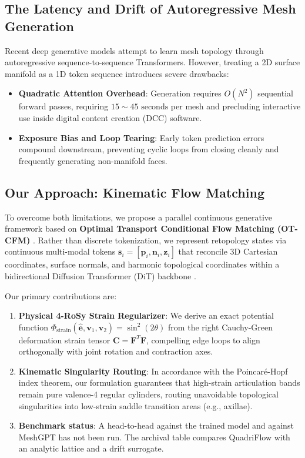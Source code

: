 \documentclass[acmtog,nonacm]{acmart}
\begin{document}
\subsection{The Latency and Drift of Autoregressive Mesh Generation}
Recent deep generative models \cite{nash2020polygen,siddiqui2024meshgpt} attempt to learn mesh topology through autoregressive sequence-to-sequence Transformers. However, treating a 2D surface manifold as a 1D token sequence introduces severe drawbacks:
\begin{itemize}
    \item \textbf{Quadratic Attention Overhead}: Generation requires $O(N^2)$ sequential forward passes, requiring $15\sim 45\text{ seconds}$ per mesh and precluding interactive use inside digital content creation (DCC) software.
    \item \textbf{Exposure Bias and Loop Tearing}: Early token prediction errors compound downstream, preventing cyclic loops from closing cleanly and frequently generating non-manifold faces.
\end{itemize}

\subsection{Our Approach: Kinematic Flow Matching}
To overcome both limitations, we propose a parallel continuous generative framework based on \textbf{Optimal Transport Conditional Flow Matching (OT-CFM)} \cite{lipman2023flow,albergo2023building}. Rather than discrete tokenization, we represent retopology states via continuous multi-modal tokens $\mathbf{s}_i = [\mathbf{p}_i, \mathbf{n}_i, \mathbf{z}_i]$ that reconcile 3D Cartesian coordinates, surface normals, and harmonic topological coordinates within a bidirectional Diffusion Transformer (DiT) backbone \cite{peebles2023scalable}.

Our primary contributions are:
\begin{enumerate}
    \item \textbf{Physical 4-RoSy Strain Regularizer}: We derive an exact potential function $\Phi_{\text{strain}}(\hat{\mathbf{e}}, \mathbf{v}_1, \mathbf{v}_2) = \sin^2(2\theta)$ from the right Cauchy-Green deformation strain tensor $\mathbf{C} = \mathbf{F}^T \mathbf{F}$, compelling edge loops to align orthogonally with joint rotation and contraction axes.
    \item \textbf{Kinematic Singularity Routing}: In accordance with the Poincaré-Hopf index theorem, our formulation guarantees that high-strain articulation bands remain pure valence-4 regular cylinders, routing unavoidable topological singularities into low-strain saddle transition areas (e.g., axillae).
    \item \textbf{Benchmark status}: A head-to-head against the trained model and against MeshGPT has not been run. The archival table compares QuadriFlow with an analytic lattice and a drift surrogate.
\end{enumerate}
\end{document}
